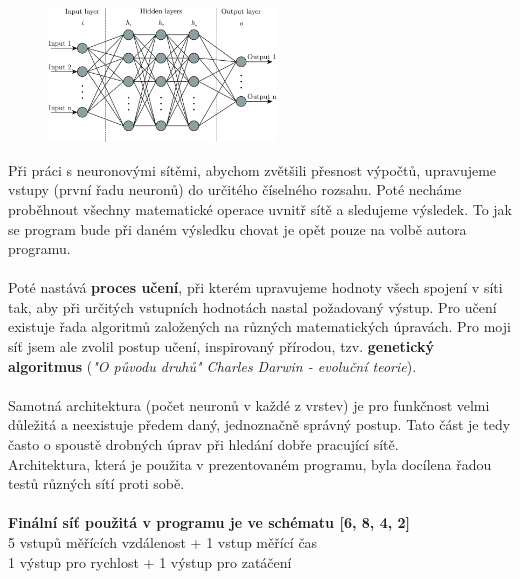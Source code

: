 \documentclass[a4paper,12pt]{article}
\newcommand{\tab}
{
    \hspace*{1em}
}
\begin{document}
        \begin{figure}[H]
            \centering
            \includegraphics[width=0.54\textwidth]{data/nn-scheme.png}
            \label{fig:deepnn}
        \end{figure}

        Při práci s neuronovými sítěmi, abychom zvětšili přesnost výpočtů, upravujeme vstupy
        (první řadu neuronů) do určitého číselného rozsahu. Poté necháme proběhnout všechny 
        matematické operace uvnitř sítě a sledujeme výsledek. To jak se program bude při daném 
        výsledku chovat je opět pouze na volbě autora programu.\\\\
        \tab Poté nastává \textbf{proces učení}, při kterém upravujeme hodnoty všech spojení v síti tak,
        aby při určitých vstupních hodnotách nastal požadovaný výstup. Pro učení existuje řada algoritmů
        založených na různých matematických úpravách. Pro moji síť jsem ale zvolil postup učení,
        inspirovaný přírodou, tzv. \textbf{genetický algoritmus} (\textit{"O původu druhů" Charles Darwin - evoluční teorie}).\\\\
        \tab Samotná architektura (počet neuronů v každé z vrstev) je pro funkčnost velmi
        důležitá a neexistuje předem daný, jednoznačně správný postup. Tato část je tedy často o 
        spoustě drobných úprav při hledání dobře pracující sítě.\\
        \tab Architektura, která je použita v prezentovaném programu, byla docílena řadou testů
        různých sítí proti sobě.\\\\
        \tab\textbf{Finální síť použitá v programu je ve schématu [6, 8, 4, 2]}\\
        5 vstupů měřících vzdálenost + 1 vstup měřící čas\\
        1 výstup pro rychlost + 1 výstup pro zatáčení
\end{document}
